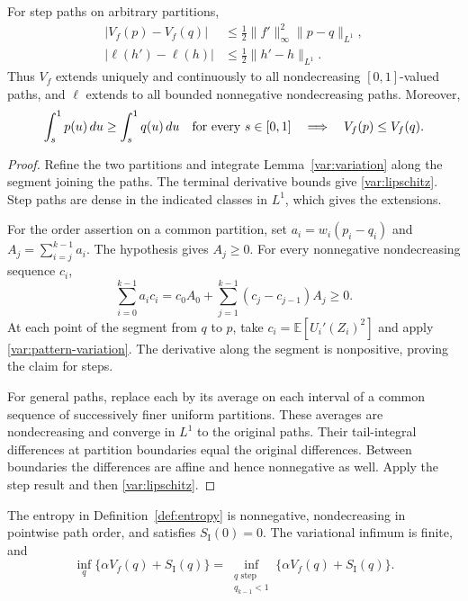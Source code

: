 \begin{proposition}
\label{var:continuity-order}
For step paths on arbitrary partitions,
\begin{align}
\label{var:lipschitz}
 |V_f(p)-V_f(q)|&\le\tfrac12\|f'\|_\infty^2\|p-q\|_{L^1},\\
 |\ell(h')-\ell(h)|&\le\tfrac12\|h'-h\|_{L^1}.
\end{align}
Thus $V_f$ extends uniquely and continuously to all nondecreasing
$[0,1]$-valued paths, and $\ell$ extends to all bounded
nonnegative nondecreasing paths. Moreover,
\begin{equation}
\label{var:tail-order}
 \int_s^1p(u)\,du\ge\int_s^1q(u)\,du
 \quad\hbox{for every }s\in[0,1]
 \quad\Longrightarrow\quad V_f(p)\le V_f(q).
\end{equation}
\end{proposition}

\begin{proof}
Refine the two partitions and integrate
Lemma~\ref{var:variation} along the segment joining the paths.
The terminal derivative bounds give \eqref{var:lipschitz}.
Step paths are dense in the indicated classes in $L^1$, which
gives the extensions.

For the order assertion on a common partition, set
$a_i=w_i(p_i-q_i)$ and $A_j=\sum_{i=j}^{k-1}a_i$.
The hypothesis gives $A_j\ge0$. For every nonnegative
nondecreasing sequence $c_i$,
\begin{equation}
\label{var:summation-parts}
 \sum_{i=0}^{k-1}a_ic_i
 =c_0 A_0+\sum_{j=1}^{k-1}(c_j-c_{j-1})A_j\ge0.
\end{equation}
At each point of the segment from $q$ to $p$, take
$c_i=\mathbb E[U_i'(Z_i)^2]$ and apply
\eqref{var:pattern-variation}. The derivative along the segment
is nonpositive, proving the claim for steps.

For general paths, replace each by its average on each interval of
a common sequence of successively finer uniform partitions.
These averages are nondecreasing and converge in $L^1$ to the
original paths. Their tail-integral differences at partition
boundaries equal the original differences. Between boundaries
the differences are affine and hence nonnegative as well.
Apply the step result and then \eqref{var:lipschitz}.
\end{proof}

\begin{corollary}
\label{var:step-reduction}
The entropy in Definition~\ref{def:entropy} is nonnegative,
nondecreasing in pointwise path order, and satisfies
$S_{\mathrm I}(0)=0$. The variational infimum is finite, and
\begin{equation}
\label{var:step-infimum}
 \inf_q\{\alpha V_f(q)+S_{\mathrm I}(q)\}
 =\inf_{\substack{q\text{ step}\\q_{k-1}<1}}
       \{\alpha V_f(q)+S_{\mathrm I}(q)\}.
\end{equation}
\end{corollary}

